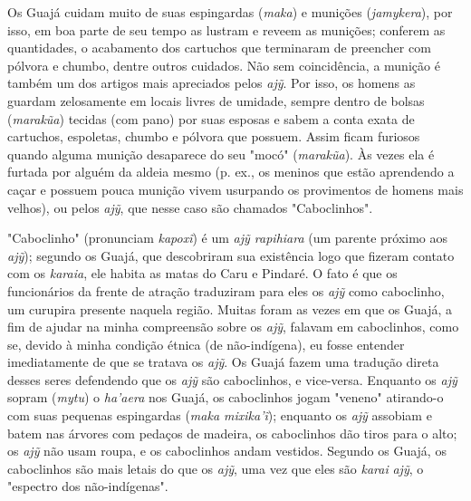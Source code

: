 Os Guajá cuidam muito de suas espingardas (\emph{maka}) e munições
(\emph{jamykera}), por isso, em boa parte de seu tempo as lustram e
reveem as munições; conferem as quantidades, o acabamento dos cartuchos
que terminaram de preencher com pólvora e chumbo, dentre outros
cuidados. Não sem coincidência, a munição é também um dos artigos mais
apreciados pelos \emph{ajỹ}. Por isso, os homens as guardam zelosamente
em locais livres de umidade, sempre dentro de bolsas (\emph{marakũa})
tecidas (com pano) por suas esposas e sabem a conta exata de cartuchos,
espoletas, chumbo e pólvora que possuem. Assim ficam furiosos quando
alguma munição desaparece do seu "mocó" (\emph{marakũa}). Às vezes ela é
furtada por alguém da aldeia mesmo (p. ex., os meninos que estão
aprendendo a caçar e possuem pouca munição vivem usurpando os
provimentos de homens mais velhos), ou pelos \emph{ajỹ}, que nesse caso
são chamados "Caboclinhos".

"Caboclinho" (pronunciam \emph{kapoxĩ}) é um \emph{ajỹ rapihiara} (um
parente próximo aos \emph{ajỹ}); segundo os Guajá, que descobriram sua
existência logo que fizeram contato com os \emph{karaia}, ele habita as
matas do Caru e Pindaré. O fato é que os funcionários da frente de
atração traduziram para eles os \emph{ajỹ} como caboclinho, um curupira
presente naquela região. Muitas foram as vezes em que os Guajá, a fim de
ajudar na minha compreensão sobre os \emph{ajỹ}, falavam em caboclinhos,
como se, devido à minha condição étnica (de não-indígena), eu fosse
entender imediatamente de que se tratava os \emph{ajỹ}. Os Guajá fazem
uma tradução direta desses seres defendendo que os \emph{ajỹ} são
caboclinhos, e vice-versa. Enquanto os \emph{ajỹ} sopram (\emph{mytu}) o
\emph{ha'aera} nos Guajá, os caboclinhos jogam "veneno" atirando-o com
suas pequenas espingardas (\emph{maka mixika'ĩ}); enquanto os \emph{ajỹ}
assobiam e batem nas árvores com pedaços de madeira, os caboclinhos dão
tiros para o alto; os \emph{ajỹ} não usam roupa, e os caboclinhos andam
vestidos. Segundo os Guajá, os caboclinhos são mais letais do que os
\emph{ajỹ}, uma vez que eles são \emph{karai} \emph{ajỹ}, o "espectro
dos não-indígenas".

